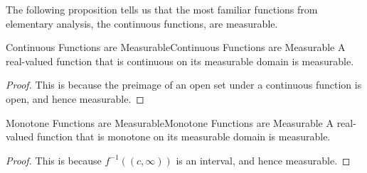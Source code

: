 \documentclass[../main.tex]{subfiles}
\begin{document}
The following proposition tells us that the most familiar functions from elementary analysis, the continuous functions, are measurable.

\begin{proposition}{Continuous Functions are Measurable}{Continuous Functions are Measurable}
	A real-valued function that is continuous on its measurable domain is measurable.
\end{proposition}
\begin{proof}
	This is because the preimage of an open set under a continuous function is open, and hence measurable.
\end{proof}

\begin{proposition}{Monotone Functions are Measurable}{Monotone Functions are Measurable}
	A real-valued function that is monotone on its measurable domain is measurable.
\end{proposition}
\begin{proof}
	This is because $f^{-1}((c, \infty))$ is an interval, and hence measurable.
\end{proof}
\end{document}
